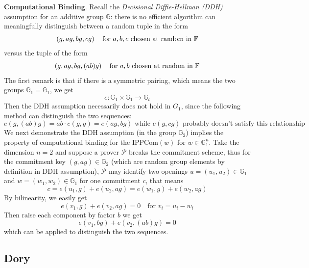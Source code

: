 \documentclass{article}
\begin{document}
\textbf{Computational Binding}. Recall the \textit{Decisional Diffie-Hellman (DDH)} assumption for an additive group $\mathbb{G}$: there is no efficient algorithm can meaningfully distinguish between a random tuple in the form
\begin{equation*}
\left( g, ag, bg, cg \right) \quad \text{for } a, b, c \text{ chosen at random in } \mathbb{F} 
\end{equation*}
versus the tuple of the form
\begin{equation*}
\left( g, ag, bg, (ab)g \right) \quad \text{for } a, b \text{ chosen at random in } \mathbb{F}
\end{equation*}
The first remark is that if there is a symmetric pairing, which means the two groups $\mathbb{G}_1 = \mathbb{G}_1$, we get
\begin{equation*}
e: \mathbb{G}_1 \times \mathbb{G}_1 \rightarrow \mathbb{G}_t
\end{equation*}
Then the DDH assumption necessarily does not hold in $G_1$, since the following method can distinguish the two sequences:
\begin{equation*}
e(g, (ab)g) = ab \cdot e(g, g) = e(ag, bg) \text{ while } e(g, cg) \text{ probably doesn't satisfy this relationship}
\end{equation*}
We next demonstrate the DDH assumption (in the group $\mathbb{G}_2$) implies the property of computational binding for the $\text{IPPCom}(w)$ for $w \in \mathbb{G}_1^n$. Take the dimension $n = 2$ and suppose a prover $\mathcal{P}$ breaks the commitment scheme, thus for the commitment key $(g, ag) \in \mathbb{G}_2$ (which are random group elements by definition in DDH assumption), $\mathcal{P}$ may identify two openings $u = (u_1, u_2) \in \mathbb{G}_1$ and $w = (w_1, w_2) \in \mathbb{G}_1$ for one commitment $c$, that means
\begin{equation*}
c = e(u_1, g) + e(u_2, ag) = e(w_1, g) + e(w_2, ag)
\end{equation*}
By bilinearity, we easily get
\begin{equation*}
e(v_1, g) + e(v_2, ag) = 0 \quad \text{for } v_i = u_i - w_i
\end{equation*}
Then raise each component by factor $b$ we get
\begin{equation*}
e(v_1, bg) + e(v_2, (ab)g) = 0
\end{equation*}
which can be applied to distinguish the two sequences. 


\subsection{Dory}
\end{document}
